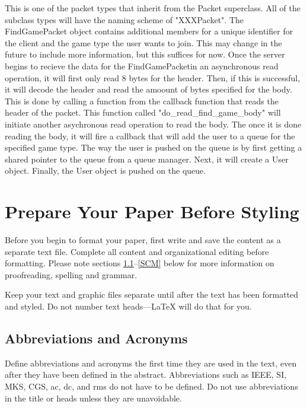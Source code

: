 \documentclass[conference]{IEEEtran}
\begin{document}
This is one of the packet types that inherit from the Packet superclass.
All of the subclass types will have the naming scheme of "XXXPacket".
The FindGamePacket object contains additional members for a unique identifier for the client and the game type the user wants to join.
This may change in the future to include more information, but this suffices for now.
Once the server begins to recieve the data for the FindGamePacketin an asynchronous read operation, it will first only read 8 bytes for the header.
Then, if this is successful, it will decode the header and read the amoount of bytes specified for the body.
This is done by calling a function from the callback function that reads the header of the packet.
This function called "do_read_find_game_body" will initiate another asychronous read operation to read the body.
The once it is done reading the body, it will fire a callback that will add the user to a queue for the specified game type.
The way the user is pushed on the queue is by first getting a shared pointer to the queue from a queue manager.
Next, it will create a User object.
Finally, the User object is pushed on the queue.


\section{Prepare Your Paper Before Styling}
Before you begin to format your paper, first write and save the content as a 
separate text file. Complete all content and organizational editing before 
formatting. Please note sections \ref{AA}--\ref{SCM} below for more information on 
proofreading, spelling and grammar.

Keep your text and graphic files separate until after the text has been 
formatted and styled. Do not number text heads---{\LaTeX} will do that 
for you.

\subsection{Abbreviations and Acronyms}\label{AA}
Define abbreviations and acronyms the first time they are used in the text, 
even after they have been defined in the abstract. Abbreviations such as 
IEEE, SI, MKS, CGS, ac, dc, and rms do not have to be defined. Do not use 
abbreviations in the title or heads unless they are unavoidable.
\end{document}
